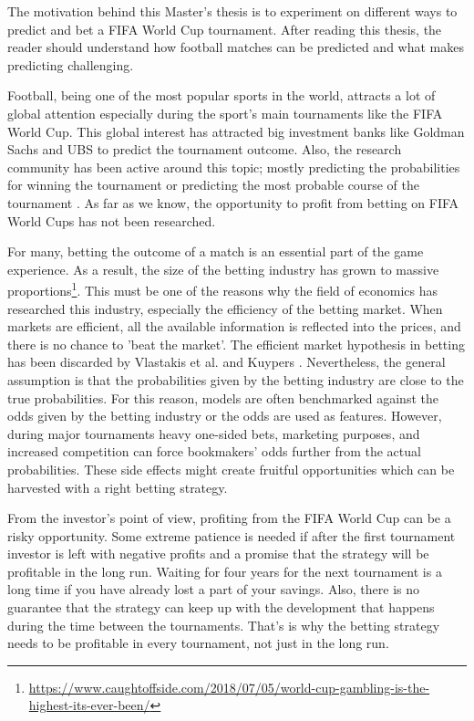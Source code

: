 

The motivation behind this Master's thesis is to experiment on different ways to predict and bet a FIFA World Cup tournament. After reading this thesis, the reader should understand how football matches can be predicted and what makes predicting challenging.

Football, being one of the most popular sports in the world, attracts a lot of global attention especially during the sport's main tournaments like the FIFA World Cup. This global interest has attracted big investment banks like Goldman Sachs and UBS to predict the tournament outcome. Also, the research community has been active around this topic; mostly predicting the probabilities for winning the tournament or predicting the most probable course of the tournament \cite{groll2018prediction, groll2015prediction, leitner2010forecasting}. As far as we know, the opportunity to profit from betting on FIFA World Cups has not been researched.

For many, betting the outcome of a match is an essential part of the game experience. As a result, the size of the betting industry has grown to massive proportions\footnote{\url{https://www.caughtoffside.com/2018/07/05/world-cup-gambling-is-the-highest-its-ever-been/}}. This must be one of the reasons why the field of economics has researched this industry, especially the efficiency of the betting market. When markets are efficient, all the available information is reflected into the prices, and there is no chance to 'beat the market'. The efficient market hypothesis in betting has been discarded by Vlastakis et al. \cite{vlastakis2009efficient} and Kuypers \cite{kuypers2008}. Nevertheless, the general assumption is that the probabilities given by the betting industry are close to the true probabilities. For this reason, models are often benchmarked against the odds given by the betting industry or the odds are used as features. \cite{leitner2010forecasting} However, during major tournaments heavy one-sided bets, marketing purposes, and increased competition can force bookmakers' odds further from the actual probabilities. These side effects might create fruitful opportunities which can be harvested with a right betting strategy.

From the investor's point of view, profiting from the FIFA World Cup can be a risky opportunity. Some extreme patience is needed if after the first tournament investor is left with negative profits and a promise that the strategy will be profitable in the long run. Waiting for four years for the next tournament is a long time if you have already lost a part of your savings. Also, there is no guarantee that the strategy can keep up with the development that happens during the time between the tournaments. That's is why the betting strategy needs to be profitable in every tournament, not just in the long run.

